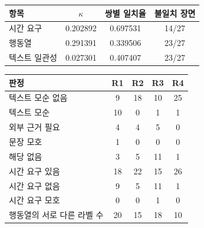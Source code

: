 \begin{table}[t]
\centering
\color{revisionblue}
\label{tab:agreement}
\footnotesize
\begin{tabularx}{\columnwidth}{Yccc}
\toprule
항목 & $\kappa$ & 쌍별 일치율 & 불일치 장면 \\
\midrule
시간 요구 & 0.202892 & 0.697531 & 14/27 \\
행동열 & 0.291391 & 0.339506 & 23/27 \\
텍스트 일관성 & 0.027301 & 0.407407 & 23/27 \\
\bottomrule
\end{tabularx}
\end{table}
\begin{table}[t]
\centering
\color{revisionblue}
\label{tab:reviewer-distribution}
\footnotesize
\begin{tabularx}{\columnwidth}{Ycccc}
\toprule
판정 & R1 & R2 & R3 & R4 \\
\midrule
텍스트 모순 없음 & 9 & 18 & 10 & 25 \\
텍스트 모순 & 10 & 0 & 1 & 1 \\
외부 근거 필요 & 4 & 4 & 5 & 0 \\
문장 모호 & 1 & 0 & 0 & 0 \\
해당 없음 & 3 & 5 & 11 & 1 \\
\midrule
시간 요구 있음 & 18 & 22 & 15 & 26 \\
시간 요구 없음 & 9 & 5 & 11 & 1 \\
시간 요구 모호 & 0 & 0 & 1 & 0 \\
행동열의 서로 다른 라벨 수 & 20 & 15 & 18 & 10 \\
\bottomrule
\end{tabularx}
\end{table}
